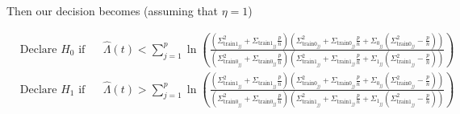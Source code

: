 \documentclass[english]{article}
\begin{document}
Then our decision becomes (assuming that $\eta=1$)

\begin{equation}
\begin{aligned}
&\text{Declare } H_0 \text{ if}
&& \hat{\Lambda}(t) < \sum_{j=1}^p\ln\left(\frac{\left(\Sigma_{\text{train}1_{jj}}^2+\Sigma_{\text{train}1_{jj}}\frac{p}{n}\right)\left(\Sigma_{\text{train}0_{jj}}^2+\Sigma_{\text{train}0_{jj}}\frac{p}{n} + \Sigma_{0_{jj}}(\Sigma_{\text{train}0_{jj}}^2 - \frac{p}{n})\right)}{\left(\Sigma_{\text{train}0_{jj}}^2+\Sigma_{\text{train}0_{jj}}\frac{p}{n}\right)\left(\Sigma_{\text{train}1_{jj}}^2+\Sigma_{\text{train}1_{jj}}\frac{p}{n} + \Sigma_{1_{jj}}(\Sigma_{\text{train}1_{jj}}^2 - \frac{p}{n})\right)}\right)\\
& \text{Declare } H_1 \text{ if}
&& \hat{\Lambda}(t) >\sum_{j=1}^p\ln\left(\frac{\left(\Sigma_{\text{train}1_{jj}}^2+\Sigma_{\text{train}1_{jj}}\frac{p}{n}\right)\left(\Sigma_{\text{train}0_{jj}}^2+\Sigma_{\text{train}0_{jj}}\frac{p}{n} + \Sigma_{0_{jj}}(\Sigma_{\text{train}0_{jj}}^2 - \frac{p}{n})\right)}{\left(\Sigma_{\text{train}0_{jj}}^2+\Sigma_{\text{train}0_{jj}}\frac{p}{n}\right)\left(\Sigma_{\text{train}1_{jj}}^2+\Sigma_{\text{train}1_{jj}}\frac{p}{n} + \Sigma_{1_{jj}}(\Sigma_{\text{train}1_{jj}}^2 - \frac{p}{n})\right)}\right)\\
\end{aligned}
\end{equation}
\end{document}
